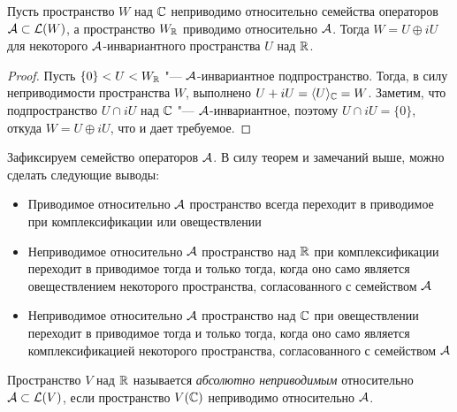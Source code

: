 

\begin{theorem}
	Пусть пространство $W$ над $\mathbb{C}$ неприводимо относительно семейства операторов $\mathcal A \subset \mathcal L(W)$, а пространство $W_{\mathbb{R}}$ приводимо относительно $\mathcal A$. Тогда $W = U \oplus iU$ для некоторого $\mathcal A$-инвариантного пространства $U$ над $\mathbb{R}$.
\end{theorem}

\begin{proof}
	Пусть $\{0\} < U < W_{\mathbb{R}}$ "--- $\mathcal A$-инвариантное подпространство. Тогда, в силу неприводимости пространства $W$, выполнено $U + iU = \langle U\rangle_{\mathbb{C}} = W$. Заметим, что подпространство $U \cap iU$  над $\mathbb{C}$ "--- $\mathcal A$-инвариантное, поэтому $U \cap iU = \{0\}$, откуда $W = U \oplus iU$, что и дает требуемое.
\end{proof}

\begin{note}
	Зафиксируем семейство операторов $\mathcal A$. В силу теорем и замечаний выше, можно сделать следующие выводы:
	\begin{itemize}
		\item Приводимое относительно $\mathcal A$ пространство всегда переходит в приводимое при комплексификации или овеществлении
		
		\item Неприводимое относительно $\mathcal A$ пространство над $\mathbb{R}$ при комплексификации переходит в приводимое тогда и только тогда, когда оно само является овеществлением некоторого пространства, согласованного с семейством $\mathcal A$
		
		\item Неприводимое относительно $\mathcal A$ пространство над $\mathbb{C}$ при овеществлении переходит в приводимое тогда и только тогда, когда оно само является комплексификацией некоторого пространства, согласованного с семейством $\mathcal A$
	\end{itemize}
\end{note}

\begin{definition}
	Пространство $V$ над $\mathbb{R}$ называется \textit{абсолютно неприводимым} относительно $\mathcal A \subset \mathcal L(V)$, если пространство $V(\mathbb{C})$ неприводимо относительно $\mathcal A$.
\end{definition}